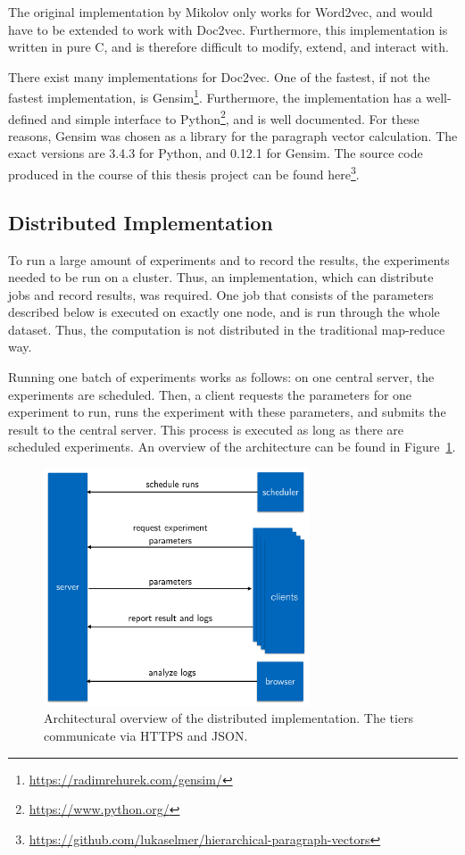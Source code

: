 The original implementation by Mikolov only works for Word2vec, and would have to be extended to work with Doc2vec. Furthermore, this implementation is written in pure C, and is therefore difficult to modify, extend, and interact with.

There exist many implementations for Doc2vec. One of the fastest, if not the fastest implementation, is Gensim\footnote{\url{https://radimrehurek.com/gensim/}}. Furthermore, the implementation has a well-defined and simple interface to Python\footnote{\url{https://www.python.org/}}, and is well documented. For these reasons, Gensim was chosen as a library for the paragraph vector calculation. The exact versions are 3.4.3 for Python, and 0.12.1 for Gensim. The source code produced in the course of this thesis project can be found here\footnote{\url{https://github.com/lukaselmer/hierarchical-paragraph-vectors}}.

\subsection{Distributed Implementation}\label{distriubted-implementation}

To run a large amount of experiments and to record the results, the experiments needed to be run on a cluster. Thus, an implementation, which can distribute jobs and record results, was required. One job that consists of the parameters described below is executed on exactly one node, and is run through the whole dataset. Thus, the computation is not distributed in the traditional map-reduce way.

Running one batch of experiments works as follows: on one central server, the experiments are scheduled. Then, a client requests the parameters for one experiment to run, runs the experiment with these parameters, and submits the result to the central server. This process is executed as long as there are scheduled experiments. An overview of the architecture can be found in Figure~\ref{fig:5:architecture}.

\begin{figure}
	\centering
	\includegraphics[width=0.7\textwidth]{5experiments/architecture.png}
	\caption{Architectural overview of the distributed implementation. The tiers communicate via HTTPS and JSON.}
	\label{fig:5:architecture}
\end{figure}

